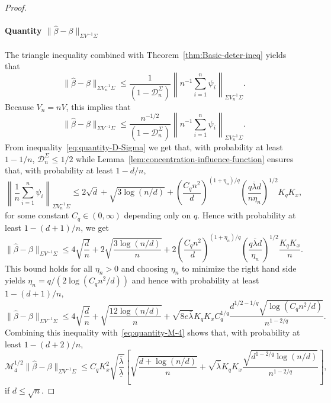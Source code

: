 \documentclass[11pt]{article}
\begin{document}
\begin{appendices}
\begin{proof}
\paragraph{Quantity $\|\widehat{\beta} - \beta\|_{\Sigma V^{-1}\Sigma}$} The triangle inequality combined with  Theorem~\ref{thm:Basic-deter-ineq} yields that
\[
\|\widehat{\beta} - \beta\|_{\Sigma V_n^{-1}\Sigma} \le \frac{1}{(1 - \mathcal{D}_n^{\Sigma})}\textstyle\left\|n^{-1}\sum_{i=1}^n \psi_i\right\|_{\Sigma V_n^{-1}\Sigma}.
\]
Because $V_n = nV$, this implies that
\[
\|\widehat{\beta} - \beta\|_{\Sigma V^{-1}\Sigma} \le \frac{n^{-1/2}}{(1 - \mathcal{D}_n^{\Sigma})}\textstyle\left\|n^{-1}\sum_{i=1}^n \psi_i\right\|_{\Sigma V_n^{-1}\Sigma}.
\]
From inequality~\eqref{eq:quantity-D-Sigma} we get that, with probability at least $1 - 1/n$, $\mathcal{D}_n^{\Sigma} \le 1/2$ while Lemma~\ref{lem:concentration-influence-function} ensures that, with probability at least $1 - d/n$,
\[
\left\|\frac{1}{n}\sum_{i=1}^n \psi_i\right\|_{\Sigma V_n^{-1}\Sigma} \le 2\sqrt{d} + \sqrt{3\log(n/d)} + \left(\frac{C_qn^2}{d}\right)^{(1 + \eta_n)/q}\left(\frac{q\overline{\lambda}d}{n\eta_n}\right)^{1/2}K_qK_x,
\]
for some constant $C_q\in(0, \infty)$ depending only on $q$. Hence with probability at least $1 - (d+1)/n$, we get
\[
\|\widehat{\beta} - \beta\|_{\Sigma V^{-1}\Sigma} \le 4\sqrt{\frac{d}{n}} + 2\sqrt{\frac{3\log(n/d)}{n}} + 2\left(\frac{C_qn^2}{d}\right)^{(1+\eta_n)/q}\left(\frac{q\overline{\lambda}d}{\eta_n}\right)^{1/2}\frac{K_qK_x}{n}.
\]
This bound holds for all $\eta_n > 0$ and choosing $\eta_n$ to minimize the right hand side yields $\eta_n = q/(2\log(C_qn^2/d))$ and hence with probability at least $1 - (d + 1)/n$,
\[
\|\widehat{\beta} - \beta\|_{\Sigma V^{-1}\Sigma} \le 4\sqrt{\frac{d}{n}} + \sqrt{\frac{12\log(n/d)}{n}} + \sqrt{8e\overline{\lambda}}K_qK_xC_q^{1/q}\frac{d^{1/2 - 1/q}\sqrt{\log(C_qn^2/d)}}{n^{1-2/q}}.
\]
Combining this inequality with~\eqref{eq:quantity-M-4} shows that, with probability at least $1 - (d + 2)/n$,
\begin{equation}\label{eq:M-4-times-betahat-error}
\mathcal{M}_4^{{1}/{2}}\|\widehat{\beta} - \beta\|_{\Sigma V^{-1}\Sigma} \le C_qK_x^2\sqrt{\frac{\overline{\lambda}}{\underline{\lambda}}}\left[\sqrt{\frac{d + \log({n}/{d})}{n}} + \sqrt{\overline{\lambda}}K_qK_x\frac{\sqrt{d^{1 - 2/q}\log({n}/{d})}}{n^{1 - 2/q}}\right],
\end{equation}
 if $d \le \sqrt{n}$. %

\end{proof}
\end{appendices}
\end{document}
